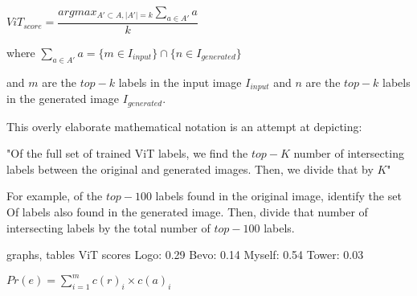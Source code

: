 \begin{center}
    $ViT_{score} = \displaystyle\dfrac{argmax_{A'\subset A,\lvert A' \rvert = k } \sum_{a \in A'} {a} }{k} $
\end{center}

where $\sum_{a \in A'} {a}  = \lbrace{m \in I_{input}}\rbrace \cap \lbrace{n \in I_{generated}}\rbrace$

and $m$ are the $top-k$ labels in the input image $I_{input}$
and $n$ are the $top-k$ labels in the generated image $I_{generated}$.


This overly elaborate mathematical notation is an attempt at depicting:

"Of the full set of trained ViT labels, we find the $top-K$ number of intersecting labels
between the original and generated images. Then, we divide that by $K$"


For example, of the $top-100$ labels found in the original image, 
identify the set Of labels also found in the generated image. 
Then, divide that number of intersecting
labels by the total number of $top-100$ labels.

graphs, tables
ViT scores
Logo: 0.29
Bevo: 0.14
Myself: 0.54
Tower: 0.03




\begin{center}
$Pr(e) = \displaystyle\sum_{i=1}^{m} c(r)_i \times c(a)_i $
\end{center}



